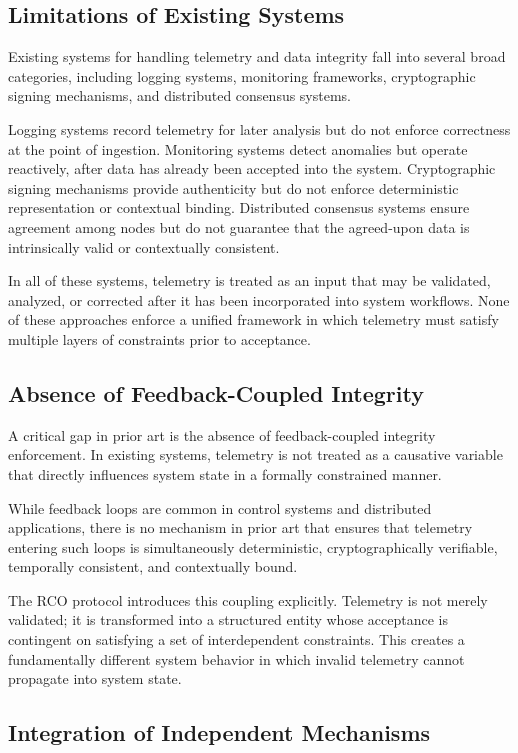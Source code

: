 \subsection{Limitations of Existing Systems}

Existing systems for handling telemetry and data integrity fall into several broad categories, including logging systems, monitoring frameworks, cryptographic signing mechanisms, and distributed consensus systems.

Logging systems record telemetry for later analysis but do not enforce correctness at the point of ingestion. Monitoring systems detect anomalies but operate reactively, after data has already been accepted into the system. Cryptographic signing mechanisms provide authenticity but do not enforce deterministic representation or contextual binding. Distributed consensus systems ensure agreement among nodes but do not guarantee that the agreed-upon data is intrinsically valid or contextually consistent.

In all of these systems, telemetry is treated as an input that may be validated, analyzed, or corrected after it has been incorporated into system workflows. None of these approaches enforce a unified framework in which telemetry must satisfy multiple layers of constraints prior to acceptance.

\subsection{Absence of Feedback-Coupled Integrity}

A critical gap in prior art is the absence of feedback-coupled integrity enforcement. In existing systems, telemetry is not treated as a causative variable that directly influences system state in a formally constrained manner.

While feedback loops are common in control systems and distributed applications, there is no mechanism in prior art that ensures that telemetry entering such loops is simultaneously deterministic, cryptographically verifiable, temporally consistent, and contextually bound.

The RCO protocol introduces this coupling explicitly. Telemetry is not merely validated; it is transformed into a structured entity whose acceptance is contingent on satisfying a set of interdependent constraints. This creates a fundamentally different system behavior in which invalid telemetry cannot propagate into system state.

\subsection{Integration of Independent Mechanisms}

